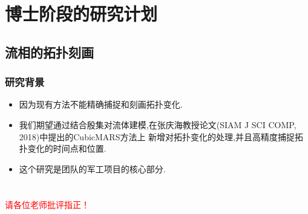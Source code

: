 \documentclass[UTF8]{ctexbeamer}	%
\theoremstyle{plain}
\theoremstyle{definition}
\theoremstyle{remark}
\numberwithin{equation}{section}
\begin{document}


\section{博士阶段的研究计划}
\subsection{流相的拓扑刻画}
\begin{frame}
    \frametitle{研究背景}
        \begin{itemize}
        \item 因为现有方法不能精确捕捉和刻画拓扑变化.
        \item 我们期望通过结合殷集对流体建模,在张庆海教授论文(SIAM J SCI COMP, 2018)中提出的CubicMARS方法上
        新增对拓扑变化的处理,并且高精度捕捉拓扑变化的时间点和位置.
        \item 这个研究是团队的军工项目的核心部分.
    \end{itemize}
\end{frame}



\section*{}
\begin{frame}
    \centering\huge
    \textcolor{red}{请各位老师批评指正！}
\end{frame}
\end{document}
